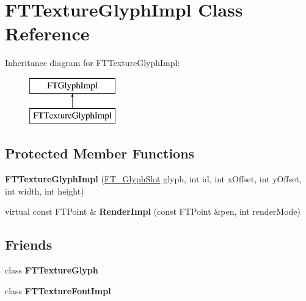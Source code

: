 \hypertarget{class_f_t_texture_glyph_impl}{}\section{F\+T\+Texture\+Glyph\+Impl Class Reference}
\label{class_f_t_texture_glyph_impl}
Inheritance diagram for F\+T\+Texture\+Glyph\+Impl\+:\begin{figure}[H]
\begin{center}
\leavevmode
\includegraphics[height=2.000000cm]{class_f_t_texture_glyph_impl}
\end{center}
\end{figure}
\subsection*{Protected Member Functions}
\begin{DoxyCompactItemize}
\item 
{\bfseries F\+T\+Texture\+Glyph\+Impl} (\hyperlink{struct_f_t___glyph_slot_rec__}{F\+T\+\_\+\+Glyph\+Slot} glyph, int id, int x\+Offset, int y\+Offset, int width, int height)\hypertarget{class_f_t_texture_glyph_impl_a63893590c3c3c45da5f3925ae9a97abd}{}\label{class_f_t_texture_glyph_impl_a63893590c3c3c45da5f3925ae9a97abd}

\item 
virtual const F\+T\+Point \& {\bfseries Render\+Impl} (const F\+T\+Point \&pen, int render\+Mode)\hypertarget{class_f_t_texture_glyph_impl_a3fce2bf9435946ae0f8ee5eacbe7f702}{}\label{class_f_t_texture_glyph_impl_a3fce2bf9435946ae0f8ee5eacbe7f702}

\end{DoxyCompactItemize}
\subsection*{Friends}
\begin{DoxyCompactItemize}
\item 
class {\bfseries F\+T\+Texture\+Glyph}\hypertarget{class_f_t_texture_glyph_impl_a01c2ee1e01ccd33e4f1f26f2478a74a0}{}\label{class_f_t_texture_glyph_impl_a01c2ee1e01ccd33e4f1f26f2478a74a0}

\item 
class {\bfseries F\+T\+Texture\+Font\+Impl}\hypertarget{class_f_t_texture_glyph_impl_a566181ddfc0f1c50d2ff9fd4160a0ff5}{}\label{class_f_t_texture_glyph_impl_a566181ddfc0f1c50d2ff9fd4160a0ff5}

\end{DoxyCompactItemize}

